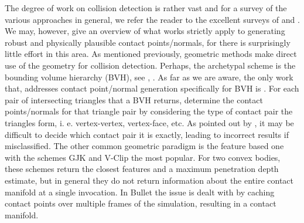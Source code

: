 \documentclass[9pt,twocolumn]{article}
\begin{document}
The degree of work on collision detection is rather vast and for a survey of the various approaches in general, we refer the reader to the excellent surveys of \cite{Lin} and \cite{Teschner}. We may, however, give an overview of what works strictly apply to generating robust and physically plausible contact points/normals, for there is surprisingly little effort in this area. As mentioned previously, geometric methods make direct use of the geometry for collision detection. Perhaps, the archetypal scheme is the bounding volume hierarchy (BVH), see \cite{Gottschalk}, \cite{Hubbard}. As far as we are aware, the only work that, addresses contact point/normal generation specifically for BVH is \cite{Erlebenetal}. For each pair of intersecting triangles that a BVH returns, \cite{Erlebenetal} determine the contact points/normals for that triangle pair by considering the type of contact pair the triangles form, i. e. vertex-vertex, vertex-face, etc. As pointed out by \cite{Erlebenetal}, it may be difficult to decide which contact pair it is exactly, leading to incorrect results if  misclassified. The other common geometric paradigm is the feature based one with the schemes GJK\cite{Gilbert} and V-Clip\cite{Mirtich} the most popular. For two convex bodies, these schemes return the closest features and a maximum penetration depth estimate, but in general they do not return information about the entire contact manifold at a single invocation\cite{Mirtich}.  In Bullet\cite{Coumans} the issue is dealt with by caching contact points over multiple frames of the simulation, resulting in a contact manifold. \newline
\end{document}
